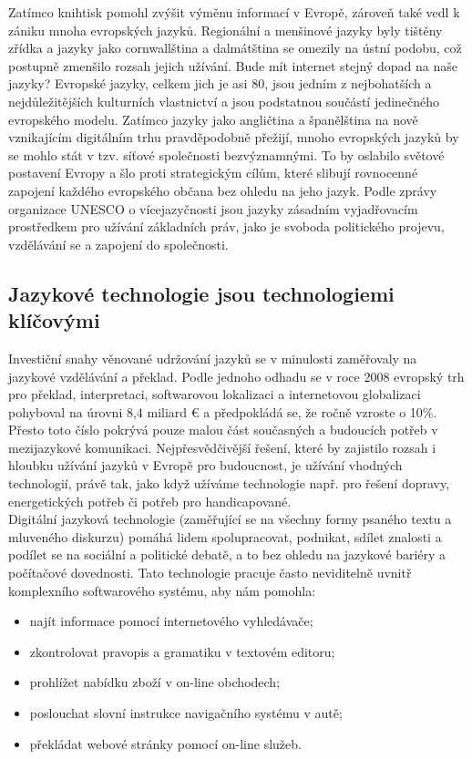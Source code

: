 \documentclass[]{../../metanetpaper}
\begin{document}
\begin{multicols}{2}
Zatímco knihtisk pomohl zvýšit výměnu informací v Evropě, zároveň také vedl k zániku mnoha evropských jazyků. Regionální a menšinové jazyky byly tištěny zřídka a jazyky jako cornwallština a dalmátština se omezily na ústní podobu, což postupně zmenšilo rozsah jejich užívání. Bude mít internet stejný dopad na naše jazyky?
Evropské jazyky, celkem jich je asi 80, jsou jedním z nejbohatších a nejdůležitějších kulturních vlastnictví a jsou podstatnou součástí jedinečného evropského modelu.\cite{EC2} Zatímco jazyky jako angličtina a španělština na nově vznikajícím digitálním trhu pravděpodobně přežijí, mnoho evropských jazyků by se mohlo stát v tzv. síťové společnosti bezvýznamnými. To by oslabilo světové postavení Evropy a šlo proti strategickým cílům, které slibují rovnocenné zapojení každého evropského občana bez ohledu na jeho jazyk. Podle zprávy organizace UNESCO o vícejazyčnosti jsou jazyky zásadním vyjadřovacím prostředkem pro užívání základních práv, jako je svoboda politického projevu, vzdělávání se a zapojení do společnosti.\cite{Unesco1}

\subsection{Jazykové technologie jsou technologiemi klíčovými}

Investiční snahy věnované udržování jazyků se v minulosti zaměřovaly na jazykové vzdělávání a překlad. Podle jednoho odhadu se v roce 2008 evropský trh pro překlad, interpretaci, softwarovou lokalizaci a internetovou globalizaci pohyboval na úrovni 8,4 miliard € a předpokládá se, že ročně vzroste o 10\%.\cite{EC3} Přesto toto číslo pokrývá pouze malou část současných a budoucích potřeb v mezijazykové komunikaci. Nejpřesvědčivější řešení, které by zajistilo rozsah i hloubku užívání jazyků v Evropě pro budoucnost, je užívání vhodných technologií, právě tak, jako když užíváme technologie např. pro řešení dopravy, energetických potřeb či potřeb pro handicapované.\\
Digitální jazyková technologie (zaměřující se na všechny formy psaného textu a mluveného diskurzu) pomáhá lidem spolupracovat, podnikat, sdílet znalosti a podílet se na sociální a politické debatě, a to bez ohledu na jazykové bariéry a počítačové dovednosti. Tato technologie pracuje často neviditelně uvnitř komplexního softwarového systému, aby nám pomohla:

    \begin{itemize}
      \item najít informace pomocí internetového vyhledávače;
      \item zkontrolovat pravopis a gramatiku v textovém editoru;
      \item prohlížet nabídku zboží v on-line obchodech;
      \item poslouchat slovní instrukce navigačního systému v autě;
      \item překládat webové stránky pomocí on-line služeb.
    \end{itemize}
    

\end{multicols}
\end{document}
